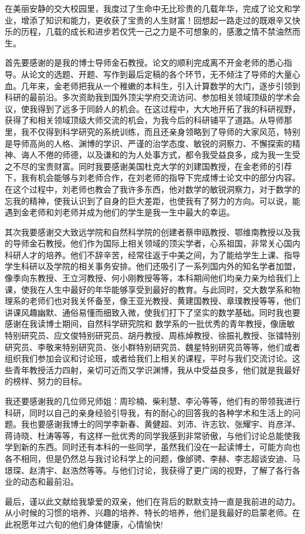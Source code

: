 
\begin{thanks}

在美丽安静的交大校园里，我度过了生命中无比珍贵的几载年华，完成了论文和学业，增添了知识和能力，更收获了宝贵的人生财富！回想起一路走过的既艰辛又快乐的历程，几载的成长和进步若仅凭一己之力是不可想象的，感激之情不禁油然而生。

首先要感谢的是我的博士导师金石教授。论文的顺利完成离不开金老师的悉心指导。从论文的选题、开题、写作到最后定稿的各个环节，无不倾注了导师的大量心血。几年来，金老师把我从一个稚嫩的本科生，引入计算数学的大门，逐步引领到科研的最前沿。多次资助我到国外顶尖学府交流访问、参加相关领域顶级的学术会议，使我得到了远多于同龄人的机会。在这过程中，大大地开拓了我的科研视野，获得了和相关领域顶级大师交流的机会，为我今后的科研铺平了道路。从导师那里，我不仅得到科学研究的系统训练，而且还亲身领略到了导师的大家风范，特别是导师高尚的人格、渊博的学识、严谨的治学态度、敏锐的洞察力、不懈探索的精神、诲人不倦的师德，以及谦和的为人处事方式，都令我受益良多，成为我一生受之不尽的宝贵财富。同时我要感谢美国杜克大学的刘建国教授，在金老师的引荐下，我有机会能够与刘老师合作，在刘老师的指导下完成博士论文中的部分内容。在这个过程中，刘老师也教会了我许多东西，他对数学的敏锐洞察力，对于数学的忘我的精神，使我认识到了自身的巨大差距，也使我有了努力的方向。可以说，能遇到金老师和刘老师并成为他们的学生是我一生中最大的幸运。

其次我要感谢交大致远学院和自然科学院的创建者蔡申瓯教授、鄂维南教授以及我的导师金石教授。他们作为国际上相关领域的顶尖学者，心系祖国，非常关心国内科研人才的培养。他们不辞辛苦，经常往返于中美之间，为了能给学生上课、指导学生科研以及学院的相关事务安排。他们还吸引了一系列国内外的知名学者加盟，像季向东教授、王立河教授、何小刚教授等等，本科期间他们均亲力亲为给我们上课，使我在人生中最好的年华能够享受到最好的教育。与此同时，交大数学系和物理系的老师们也对我关怀备至，像王亚光教授、黄建国教授、章璞教授等等，他们讲课风趣幽默、通俗易懂而细致入微，使我们打下了坚实的数学基础。同时我也要感谢在我读博士期间，自然科学研究院和
数学系的一批优秀的青年教授，像唐敏特别研究员、应文俊特别研究员、胡丹教授、周栋焯教授、徐振礼教授、张镭特别研究员、李敬来特别研究员、张小群特别研究员、魏星特别研究员等等，他们或者组织我们参加会议和讨论班，或者给我们上相关的课程，平时与我们交流讨论。这些青年教授活力四射，亲切可近而又学识渊博，我从中受益良多，他们就是我最好的榜样、努力的目标。

我还要感谢我的几位师兄师姐：周珍楠、柴利慧、李沁等等，他们有的带领我进行科研，同时以自己的亲身经验引导我，有的耐心的回答我的各种学术和生活上的问题。我也要感谢我博士的同学李新春、黄健超、刘沛、许志钦、张耀宇、肖彦洋、蒋诗晓、杜涛等等，有这样一批优秀的同学我感到非常骄傲，与他们讨论总能使我学到新的东西。同时还有本科的一些同学，虽然我们没在一起读博士，可能方向也各不相同，但是仍然总与我讨论科学上的问题，像邰骋、李赫、李志超谈安迪、马璟琛、赵清宇、赵浩然等等。与他们讨论，我获得了更广阔的视野，了解了各行各业的动态和最前沿。

最后，谨以此文献给我挚爱的双亲，他们在背后的默默支持一直是我前进的动力。从小时候的习惯的培养、兴趣的培养、特长的培养，他们是我最好的启蒙老师。在此祝愿年过六旬的他们身体健康，心情愉快!

\end{thanks}
